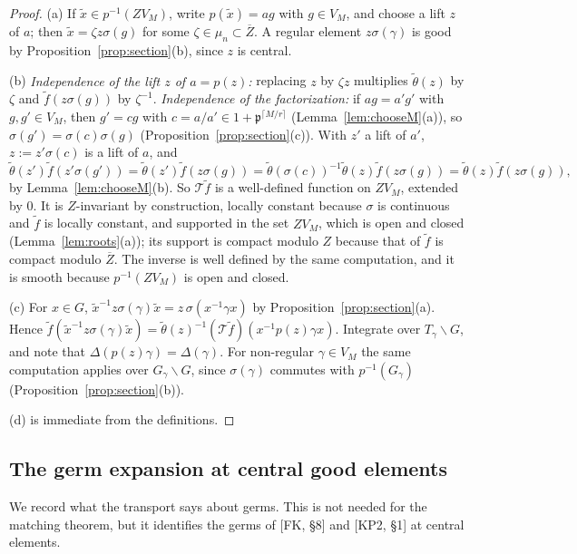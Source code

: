 \documentclass[12pt]{article}
\newcommand{\ov}[1]{\overline{#1}}
\newcommand{\fp}{\mathfrak{p}}
\newcommand{\Zb}{\ov{Z}}
\newcommand{\sg}{\sigma}
\theoremstyle{plain}
\theoremstyle{definition}
\begin{document}
\begin{proof}
(a) If $\tilde x\in p^{-1}(ZV_M)$, write $p(\tilde x)=ag$ with $g\in V_M$, and choose a lift $z$ of $a$; then $\tilde x=\zeta z\sg(g)$ for some $\zeta\in\mu_n\subset\Zb$. A regular element $z\sg(\gamma)$ is good by Proposition~\ref{prop:section}(b), since $z$ is central.

(b) \emph{Independence of the lift $z$ of $a=p(z)$:} replacing $z$ by $\zeta z$ multiplies $\tilde\theta(z)$ by $\zeta$ and $\tilde f(z\sg(g))$ by $\zeta^{-1}$. \emph{Independence of the factorization:} if $ag=a'g'$ with $g,g'\in V_M$, then $g'=cg$ with $c=a/a'\in1+\fp^{\lceil M/r\rceil}$ (Lemma~\ref{lem:chooseM}(a)), so $\sg(g')=\sg(c)\sg(g)$ (Proposition~\ref{prop:section}(c)). With $z'$ a lift of $a'$, $z:=z'\sg(c)$ is a lift of $a$, and
\[ \tilde\theta(z')\tilde f(z'\sg(g'))=\tilde\theta(z')\tilde f(z\sg(g))=\tilde\theta(\sg(c))^{-1}\tilde\theta(z)\tilde f(z\sg(g))=\tilde\theta(z)\tilde f(z\sg(g)), \]
by Lemma~\ref{lem:chooseM}(b). So $\mathcal T\tilde f$ is a well-defined function on $ZV_M$, extended by $0$. It is $Z$-invariant by construction, locally constant because $\sg$ is continuous and $\tilde f$ is locally constant, and supported in the set $ZV_M$, which is open and closed (Lemma~\ref{lem:roots}(a)); its support is compact modulo $Z$ because that of $\tilde f$ is compact modulo $\Zb$. The inverse is well defined by the same computation, and it is smooth because $p^{-1}(ZV_M)$ is open and closed.

(c) For $x\in G$, $\tilde x^{-1}z\sg(\gamma)\tilde x=z\,\sg(x^{-1}\gamma x)$ by Proposition~\ref{prop:section}(a). Hence $\tilde f(\tilde x^{-1}z\sg(\gamma)\tilde x)=\tilde\theta(z)^{-1}(\mathcal T\tilde f)(x^{-1}p(z)\gamma x)$. Integrate over $T_\gamma\backslash G$, and note that $\Delta(p(z)\gamma)=\Delta(\gamma)$. For non-regular $\gamma\in V_M$ the same computation applies over $G_\gamma\backslash G$, since $\sg(\gamma)$ commutes with $p^{-1}(G_\gamma)$ (Proposition~\ref{prop:section}(b)).

(d) is immediate from the definitions.
\end{proof}


\subsection{The germ expansion at central good elements}\label{subsec:germexp}
We record what the transport says about germs. This is not needed for the matching theorem, but it identifies the germs of [FK, \S8] and [KP2, \S1] at central elements.
\end{document}
